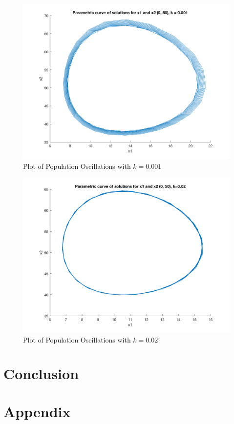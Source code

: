 \documentclass[12pt]{article}   %
\theoremstyle{definition}
\numberwithin{equation}{section}
\begin{document}
\begin{figure} [h] 
  \centering
  \includegraphics[width=15cm]{circ001.png}
  \caption{Plot of Population Oscillations with $k=0.001$}
  \label{fig:circ001}
\end{figure}

\begin{figure} [h] 
  \centering
  \includegraphics[width=15cm]{circ02.png}
  \caption{Plot of Population Oscillations with $k=0.02$}
  \label{fig:circ02}
\end{figure}

\newpage
\setcounter{page}{4}
\section{Conclusion} \label{APPM2360proj01sec01}


\newpage
\setcounter{page}{7}
\section{Appendix} \label{APPM2360proj01sec01}
\end{document}
